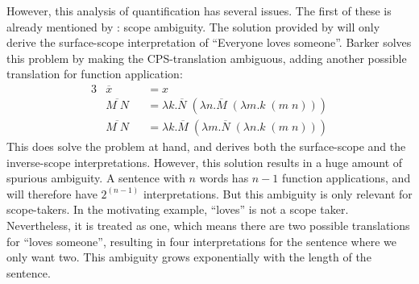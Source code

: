 However, this analysis of quantification has several issues. The first
of these is already mentioned by \citet{barker2004}: scope ambiguity.
The solution provided by \citet{barker2002,barker2004} will only
derive the surface-scope interpretation of ``Everyone loves
someone''. Barker solves this problem by making the CPS-translation
ambiguous, adding another possible translation for function
application:
\begin{alignat*}{3}
  &\overline{x}    &&= x\\
  &\overline{M\;N} &&= \lambda k. \overline{N}\;(\lambda n.\overline{M}\;(\lambda m.k\;(m\;n)))\\
  &\overline{M\;N} &&= \lambda k. \overline{M}\;(\lambda m.\overline{N}\;(\lambda n.k\;(m\;n)))
\end{alignat*}
This does solve the problem at hand, and derives both the
surface-scope and the inverse-scope interpretations. However, this
solution results in a huge amount of spurious ambiguity.
A sentence with $n$ words has $n-1$ function applications, and will
therefore have $2^{(n-1)}$ interpretations. But this ambiguity is only
relevant for scope-takers.
In the motivating example, ``loves'' is not a scope
taker. Nevertheless, it is treated as one, which means there are two
possible translations for ``loves someone'', resulting in four
interpretations for the sentence where we only want two. This
ambiguity grows exponentially with the length of the sentence.


\vspace*{1\baselineskip}

